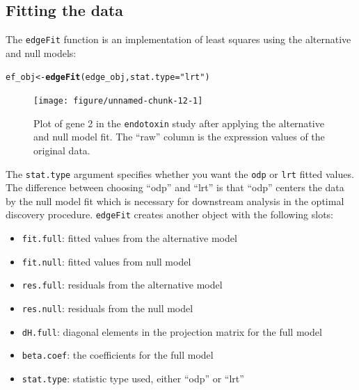 \documentclass{article}\usepackage[]{graphicx}\usepackage[]{color}
\makeatletter
\newcommand{\hlstr}[1]{\textcolor[rgb]{0.192,0.494,0.8}{#1}}%
\newcommand{\hlstd}[1]{\textcolor[rgb]{0.345,0.345,0.345}{#1}}%
\newcommand{\hlkwb}[1]{\textcolor[rgb]{0.69,0.353,0.396}{#1}}%
\newcommand{\hlkwc}[1]{\textcolor[rgb]{0.333,0.667,0.333}{#1}}%
\newcommand{\hlkwd}[1]{\textcolor[rgb]{0.737,0.353,0.396}{\textbf{#1}}}%
\newenvironment{kframe}{%
 \def\at@end@of@kframe{}%
 \ifinner\ifhmode%
  \def\at@end@of@kframe{\end{minipage}}%
  \begin{minipage}{\columnwidth}%
 \fi\fi%
 \def\FrameCommand##1{\hskip\@totalleftmargin \hskip-\fboxsep
 \colorbox{shadecolor}{##1}\hskip-\fboxsep
     \hskip-\linewidth \hskip-\@totalleftmargin \hskip\columnwidth}%
 \MakeFramed {\advance\hsize-\width
   \@totalleftmargin\z@ \linewidth\hsize
   \@setminipage}}%
 {\par\unskip\endMakeFramed%
 \at@end@of@kframe}
\newenvironment{knitrout}{}{} %
\makeatother
\begin{document}
\subsection{Fitting the data}
The {\tt edgeFit} function is an implementation of least squares using the alternative and null models:
\begin{knitrout}
\color{fgcolor}\begin{kframe}
\begin{alltt}
\hlstd{ef_obj} \hlkwb{<-} \hlkwd{edgeFit}\hlstd{(edge_obj,} \hlkwc{stat.type} \hlstd{=} \hlstr{"lrt"}\hlstd{)}
\end{alltt}
\end{kframe}
\end{knitrout}

\begin{figure}[t]
 \centering
\begin{knitrout}
\color{fgcolor}

{\centering \texttt{[image: figure/unnamed-chunk-12-1]} 

}



\end{knitrout}
\caption{Plot of gene 2 in the {\tt endotoxin} study after applying the alternative and null model fit. The ``raw'' column is the expression values of the original data.}
\label{fig:eplotFit}
\end{figure}
The {\tt stat.type} argument specifies whether you want the {\tt odp} or {\tt lrt} fitted values. The difference between choosing ``odp'' and ``lrt'' is that ``odp'' centers the data by the null model fit which is necessary for downstream analysis in the optimal discovery procedure. {\tt edgeFit} creates another object with the following slots:
\begin{itemize}
\item {\tt fit.full}: fitted values from the alternative model
\item {\tt fit.null}: fitted values from null model
\item {\tt res.full}: residuals from the alternative model
\item {\tt res.null}: residuals from the null model
\item {\tt dH.full}: diagonal elements in the projection matrix for the full model
\item {\tt beta.coef}: the coefficients for the full model
\item {\tt stat.type}: statistic type used, either ``odp'' or ``lrt''
\end{itemize}
\end{document}
